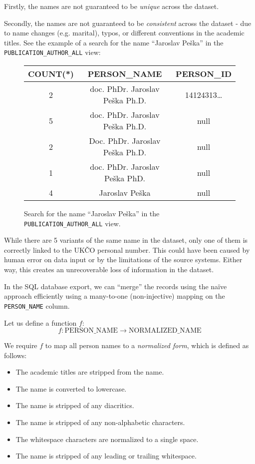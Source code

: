 Firstly, the names are not guaranteed to be \textit{unique} across the dataset. 

Secondly, the names are not guaranteed to be \textit{consistent} across the dataset - due to name changes (e.g. marital), 
typos, or different conventions in the academic titles.
See the example of a search for the name ``Jaroslav Peška'' in the \texttt{PUBLICATION\_AUTHOR\_ALL} view:

\begin{figure}[!ht]\label{fig:jaroslav-peska}
    \captionsetup{width=.9\linewidth}
    \centering
    \begin{tabular}{|c|c|c|}
    \hline
        COUNT(*) & PERSON\_NAME & PERSON\_ID \\ \hline
        2 & doc. PhDr. Jaroslav Peška Ph.D. & 14124313\dots \footnotemark \\ \hline
        5 & doc. PhDr. Jaroslav Peška Ph.D. & null \\ \hline
        2 & Doc. PhDr. Jaroslav Peška Ph.D. & null \\ \hline
        1 & doc. PhDr. Jaroslav Peška PhD. & null \\ \hline
        4 & Jaroslav Peška & null \\ \hline
    \end{tabular}
    \caption{Search for the name ``Jaroslav Peška'' in the \texttt{PUBLICATION\_AUTHOR\_ALL} view.}
\end{figure}


While there are 5 variants of the same name in the dataset, only one of them is correctly linked to the UKČO personal number.
This could have been caused by human error on data input or by the limitations of the source systems. 
Either way, this creates an unrecoverable loss of information in the dataset.

In the SQL database export, we can ``merge'' the records using the naïve approach efficiently using a many-to-one (non-injective) mapping
on the \texttt{PERSON\_NAME} column.

Let us define a function $f$:
$$f: \text{PERSON\_NAME} \to \text{NORMALIZED\_NAME}$$

We require $f$ to map all person names to a \textit{normalized form}, which is defined as follows:
\begin{itemize}
    \item The academic titles are stripped from the name.
    \item The name is converted to lowercase.
    \item The name is stripped of any diacritics.
    \item The name is stripped of any non-alphabetic characters.
    \item The whitespace characters are normalized to a single space.
    \item The name is stripped of any leading or trailing whitespace.
\end{itemize}

